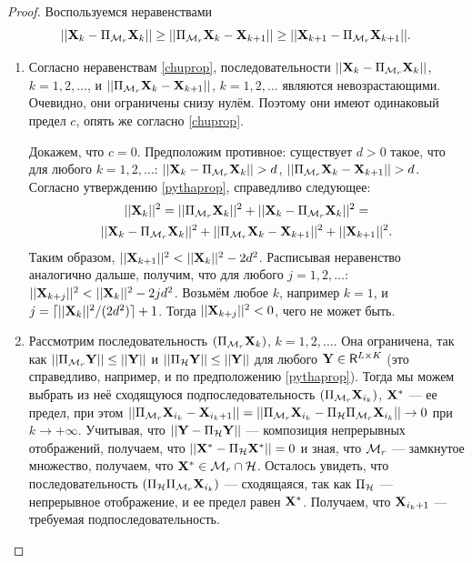 \documentclass[12pt,a4paper,fleqn,leqno]{article}
\begin{document}
\begin{proof}
Воспользуемся неравенствами \cite{Chu.etal2003}
\begin{equation}
\label{chuprop}
||\mathbf{X}_k - \Pi_{\mathcal{M}_r} \mathbf{X}_k|| \ge ||\Pi_{\mathcal{M}_r} \mathbf{X}_k - \mathbf{X}_{k + 1}|| \ge ||\mathbf{X}_{k+1} - \Pi_{\mathcal{M}_r} \mathbf{X}_{k + 1}||.
\end{equation}

\begin{enumerate}
\item Согласно неравенствам \eqref{chuprop}, последовательности $||\mathbf{X}_k - \Pi_{\mathcal{M}_r} \mathbf{X}_k||$, $k = 1, 2, \ldots$, и $||\Pi_{\mathcal{M}_r} \mathbf{X}_k - \mathbf{X}_{k + 1}||$, $k = 1, 2, \ldots$ являются невозрастающими. Очевидно, они ограничены снизу нулём. Поэтому они имеют одинаковый предел $c$, опять же согласно \eqref{chuprop}.

Докажем, что $c = 0$. Предположим противное: существует $d > 0$ такое, что для любого $k = 1, 2, \ldots$: $||\mathbf{X}_k - \Pi_{\mathcal{M}_r} \mathbf{X}_k|| > d$, $||\Pi_{\mathcal{M}_r} \mathbf{X}_k - \mathbf{X}_{k + 1}|| > d$. Согласно утверждению \ref{pythaprop}, справедливо следующее:
\begin{gather*}
||\mathbf{X}_k||^2 = ||\Pi_{\mathcal{M}_r} \mathbf{X}_k||^2 + ||\mathbf{X}_k - \Pi_{\mathcal{M}_r} \mathbf{X}_k||^2 =\\ ||\mathbf{X}_k - \Pi_{\mathcal{M}_r} \mathbf{X}_k||^2 + ||\Pi_{\mathcal{M}_r} \mathbf{X}_k - \mathbf{X}_{k + 1}||^2 + ||\mathbf{X}_{k + 1}||^2.
\end{gather*}
Таким образом, $||\mathbf{X}_{k+1}||^2 < ||\mathbf{X}_k||^2 - 2d^2$. Расписывая неравенство аналогично дальше, получим, что для любого $j = 1, 2, \ldots$: $||\mathbf{X}_{k+j}||^2 < ||\mathbf{X}_k||^2 - 2 j d^2$. Возьмём любое $k$, например $k = 1$, и $j = \lceil ||\mathbf{X}_k||^2 / (2d^2) \rceil + 1$. Тогда $||\mathbf{X}_{k+j}||^2 < 0$, чего не может быть.
\item Рассмотрим последовательность $(\Pi_{\mathcal{M}_r} \mathbf{X}_k)$, $k = 1, 2, \ldots$. Она ограничена, так как $||\Pi_{\mathcal{M}_r} \mathbf{Y}|| \le ||\mathbf{Y}||$ и $||\Pi_{\mathcal{H}} \mathbf{Y}|| \le ||\mathbf{Y}||$ для любого $\mathbf{Y} \in \mathsf{R}^{L \times K}$ (это справедливо, например, и по предположению \ref{pythaprop}). Тогда мы можем выбрать из неё сходящуюся подпоследовательность $(\Pi_{\mathcal{M}_r} \mathbf{X}_{i_k})$, $\mathbf{X}^*$ --- ее предел, при этом $||\Pi_{\mathcal{M}_r} \mathbf{X}_{i_k} - \mathbf{X}_{i_k + 1}|| = ||\Pi_{\mathcal{M}_r} \mathbf{X}_{i_k} - \Pi_{\mathcal{H}} \Pi_{\mathcal{M}_r} \mathbf{X}_{i_k}|| \to 0$ при $k \to + \infty$. Учитывая, что $||\mathbf{Y} - \Pi_{\mathcal{H}} \mathbf{Y}||$ --- композиция непрерывных отображений, получаем, что $||\mathbf{X}^* - \Pi_{\mathcal{H}} \mathbf{X}^*|| = 0$ и зная, что $\mathcal{M}_r$ --- замкнутое множество, получаем, что $\mathbf{X}^* \in \mathcal{M}_r \cap \mathcal{H}$. Осталось увидеть, что последовательность $(\Pi_{\mathcal{H}} \Pi_{\mathcal{M}_r} \mathbf{X}_{i_k})$ --- сходящаяся, так как $\Pi_{\mathcal{H}}$ --- непрерывное отображение, и ее предел равен $\mathbf{X}^*$. Получаем, что $\mathbf{X}_{i_k + 1}$ --- требуемая подпоследовательность.
\end{enumerate}
\end{proof}
\end{document}
